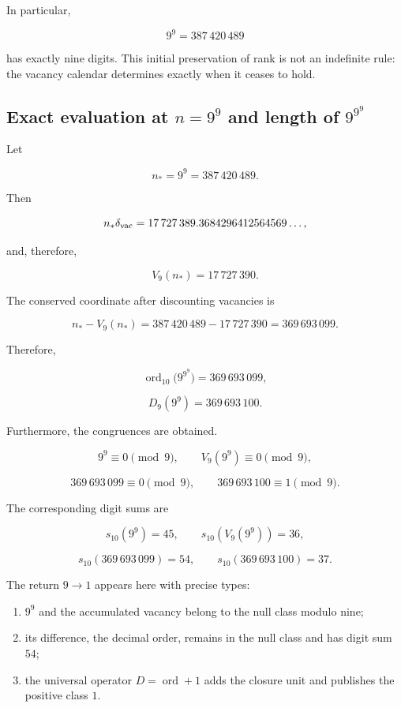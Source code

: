 In particular,

\[
9^9=387\,420\,489
\]

has exactly nine digits. This initial preservation of rank is not an indefinite rule: the vacancy calendar determines exactly when it ceases to hold.

\subsection{Exact evaluation at \(n=9^9\) and length of \(9^{9^9}\)}

Let

\[
n_*=9^9=387\,420\,489.
\]

Then

\[
n_*\delta_{\rm vac}
=17\,727\,389.3684296412564569\ldots,
\]

and, therefore,

\[
\boxed{V_9(n_*)=17\,727\,390}.
\]

The conserved coordinate after discounting vacancies is

\[
n_*-V_9(n_*)
=387\,420\,489-17\,727\,390
=369\,693\,099.
\]

Therefore,

\[
\boxed{\operatorname{ord}_{10}\bigl(9^{9^9}\bigr)=369\,693\,099},
\]

\[
\boxed{D_9(9^9)=369\,693\,100}.
\]

Furthermore, the congruences are obtained.

\[
9^9\equiv0\pmod9,\qquad
V_9(9^9)\equiv0\pmod9,
\]

\[
369\,693\,099\equiv0\pmod9,\qquad
369\,693\,100\equiv1\pmod9.
\]

The corresponding digit sums are

\[
s_{10}(9^9)=45,\qquad
s_{10}(V_9(9^9))=36,
\]

\[
s_{10}(369\,693\,099)=54,\qquad
s_{10}(369\,693\,100)=37.
\]

The return \(9\to1\) appears here with precise types:

\begin{enumerate}
\item \(9^9\) and the accumulated vacancy belong to the null class modulo nine;
\item its difference, the decimal order, remains in the null class and has digit sum \(54\);
\item the universal operator \(D=\operatorname{ord}+1\) adds the closure unit and publishes the positive class \(1\).
\end{enumerate}

